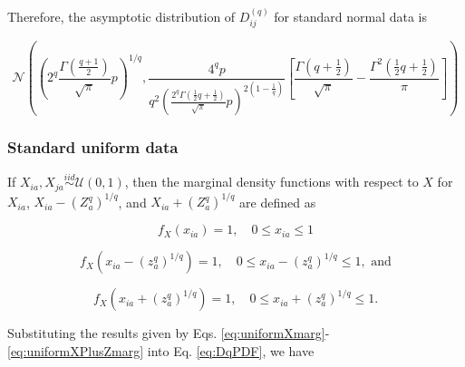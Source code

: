 \documentclass[10pt,letterpaper]{article}\usepackage[]{graphicx}\usepackage[]{color}
\begin{document}
Therefore, the asymptotic distribution of $D^{(q)}_{ij}$ for standard normal data is

\begin{equation}\label{eq:normalDistr}
\mathcal{N}\left(\left(2^q\frac{\Gamma\left(\frac{q + 1}{2}\right)}{\sqrt{\pi}}p\right)^{1/q},
\frac{4^q p}{q^2 \left(\frac{2^q \Gamma\left(\frac{1}{2}q + \frac{1}{2}\right)}{\sqrt{\pi}}p\right)^{2\left(1 - \frac{1}{q}\right)}}\left[\frac{\Gamma\left(q + \frac{1}{2}\right)}{\sqrt{\pi}} - \frac{\Gamma^2\left(\frac{1}{2}q + \frac{1}{2}\right)}{\pi}\right]\right)
\end{equation}

\subsubsection{Standard uniform data}

If $X_{ia},X_{ja} \overset{iid}{\sim} \mathcal{U}(0,1)$, then the marginal density functions with respect to $X$ for $X_{ia}$, $X_{ia} - \left(Z^q_a\right)^{1/q}$, and $X_{ia} + \left(Z^q_a\right)^{1/q}$ are defined as

\begin{equation}\label{eq:uniformXmarg}
f_X(x_{ia}) = 1, \quad 0 \leq x_{ia} \leq 1
\end{equation}

\begin{equation}\label{eq:uniformXMinusZmarg}
f_X\left(x_{ia} - \left(z^q_a\right)^{1/q}\right) = 1, \quad 0 \leq x_{ia} - \left(z^q_a\right)^{1/q} \leq 1, \text{ and}
\end{equation}

\begin{equation}\label{eq:uniformXPlusZmarg}
f_X\left(x_{ia} + \left(z^q_a\right)^{1/q}\right) = 1, \quad 0 \leq x_{ia} + \left(z^q_a\right)^{1/q} \leq 1.
\end{equation}

Substituting the results given by Eqs. \ref{eq:uniformXmarg}-\ref{eq:uniformXPlusZmarg} into Eq. \ref{eq:DqPDF}, we have
\end{document}

